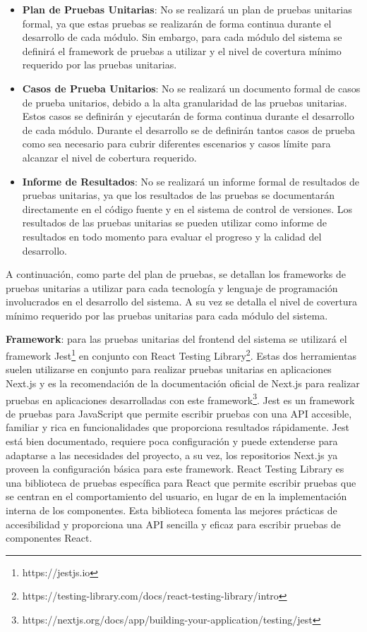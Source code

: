 \documentclass[main.tex]{subfiles}
\begin{document}
\begin{itemize}
	\item \textbf{Plan de Pruebas Unitarias}: No se realizará un plan de pruebas unitarias formal, ya que estas pruebas se realizarán de forma continua durante el desarrollo de cada módulo. Sin embargo, para cada módulo del sistema se definirá el framework de pruebas a utilizar y el nivel de covertura mínimo requerido por las pruebas unitarias.
	\item \textbf{Casos de Prueba Unitarios}: No se realizará un documento formal de casos de prueba unitarios, debido a la alta granularidad de las pruebas unitarias. Estos casos se definirán y ejecutarán de forma continua durante el desarrollo de cada módulo. Durante el desarrollo se de definirán tantos casos de prueba como sea necesario para cubrir diferentes escenarios y casos límite para alcanzar el nivel de cobertura requerido.
	\item \textbf{Informe de Resultados}: No se realizará un informe formal de resultados de pruebas unitarias, ya que los resultados de las pruebas se documentarán directamente en el código fuente y en el sistema de control de versiones. Los resultados de las pruebas unitarias se pueden utilizar como informe de resultados en todo momento para evaluar el progreso y la calidad del desarrollo.
\end{itemize}

A continuación, como parte del plan de pruebas, se detallan los frameworks de pruebas unitarias a utilizar para cada tecnología y lenguaje de programación involucrados en el desarrollo del sistema. A su vez se detalla el nivel de covertura mínimo requerido por las pruebas unitarias para cada módulo del sistema.


\textbf{Framework}: para las pruebas unitarias del frontend del sistema se utilizará el framework Jest\footnote{https://jestjs.io} en conjunto con React Testing Library\footnote{https://testing-library.com/docs/react-testing-library/intro}. Estas dos herramientas suelen utilizarse en conjunto para realizar pruebas unitarias en aplicaciones Next.js y es la recomendación de la documentación oficial de Next.js para realizar pruebas en aplicaciones desarrolladas con este framework\footnote{https://nextjs.org/docs/app/building-your-application/testing/jest}. Jest es un framework de pruebas para JavaScript que permite escribir pruebas con una API accesible, familiar y rica en funcionalidades que proporciona resultados rápidamente. Jest está bien documentado, requiere poca configuración y puede extenderse para adaptarse a las necesidades del proyecto, a su vez, los repositorios Next.js ya proveen la configuración básica para este framework. React Testing Library es una biblioteca de pruebas específica para React que permite escribir pruebas que se centran en el comportamiento del usuario, en lugar de en la implementación interna de los componentes. Esta biblioteca fomenta las mejores prácticas de accesibilidad y proporciona una API sencilla y eficaz para escribir pruebas de componentes React.
\end{document}
